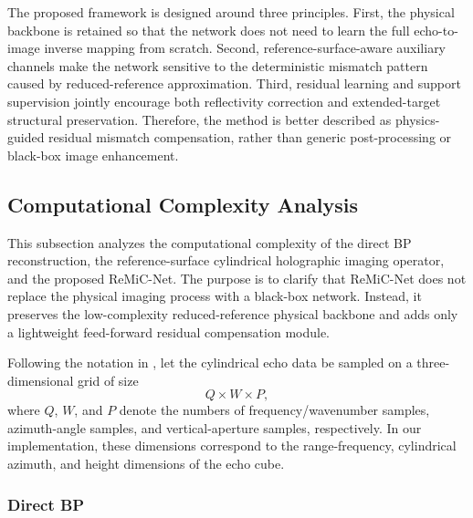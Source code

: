 \documentclass[journal]{IEEEtran}
\begin{document}
The proposed framework is designed around three principles. First, the physical backbone is retained so that the network does not need to learn the full echo-to-image inverse mapping from scratch. Second, reference-surface-aware auxiliary channels make the network sensitive to the deterministic mismatch pattern caused by reduced-reference approximation. Third, residual learning and support supervision jointly encourage both reflectivity correction and extended-target structural preservation. Therefore, the method is better described as physics-guided residual mismatch compensation, rather than generic post-processing or black-box image enhancement.


\subsection{Computational Complexity Analysis}
\label{subsec:complexity_analysis}

This subsection analyzes the computational complexity of the direct BP reconstruction, the reference-surface cylindrical holographic imaging operator, and the proposed ReMiC-Net. The purpose is to clarify that ReMiC-Net does not replace the physical imaging process with a black-box network. Instead, it preserves the low-complexity reduced-reference physical backbone and adds only a lightweight feed-forward residual compensation module.

Following the notation in \cite{Tan}, let the cylindrical echo data be sampled on a three-dimensional grid of size
\begin{equation}
    Q \times W \times P,
\end{equation}
where $Q$, $W$, and $P$ denote the numbers of frequency/wavenumber samples, azimuth-angle samples, and vertical-aperture samples, respectively. In our implementation, these dimensions correspond to the range-frequency, cylindrical azimuth, and height dimensions of the echo cube.

\subsubsection{Direct BP}
\end{document}
